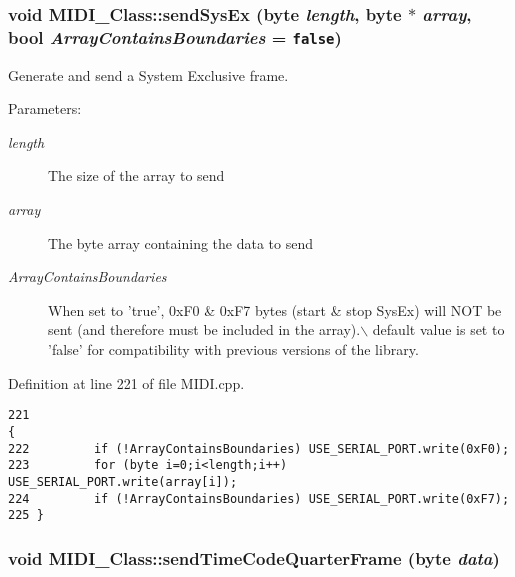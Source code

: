 \hypertarget{class_m_i_d_i___class_73a36cacf4e77ca081979f9c7066ee28}{
\subsubsection[{sendSysEx}]{\setlength{\rightskip}{0pt plus 5cm}void MIDI\_\-Class::sendSysEx ({\bf byte} {\em length}, \/  {\bf byte} $\ast$ {\em array}, \/  bool {\em ArrayContainsBoundaries} = {\tt false})}}
\label{class_m_i_d_i___class_73a36cacf4e77ca081979f9c7066ee28}


Generate and send a System Exclusive frame. \begin{Desc}
\item[Parameters:]
\begin{description}
\item[{\em length}]The size of the array to send \item[{\em array}]The byte array containing the data to send \item[{\em ArrayContainsBoundaries}]When set to 'true', 0xF0 \& 0xF7 bytes (start \& stop SysEx) will NOT be sent (and therefore must be included in the array).$\backslash$ default value is set to 'false' for compatibility with previous versions of the library. \end{description}
\end{Desc}


Definition at line 221 of file MIDI.cpp.

\begin{Code}\begin{verbatim}221                                                                                   {
222         if (!ArrayContainsBoundaries) USE_SERIAL_PORT.write(0xF0);
223         for (byte i=0;i<length;i++) USE_SERIAL_PORT.write(array[i]);
224         if (!ArrayContainsBoundaries) USE_SERIAL_PORT.write(0xF7);
225 }
\end{verbatim}
\end{Code}


\hypertarget{class_m_i_d_i___class_1f720df72c5253d85d1d547d09357ea0}{
\subsubsection[{sendTimeCodeQuarterFrame}]{\setlength{\rightskip}{0pt plus 5cm}void MIDI\_\-Class::sendTimeCodeQuarterFrame ({\bf byte} {\em data})}}
\label{class_m_i_d_i___class_1f720df72c5253d85d1d547d09357ea0}


